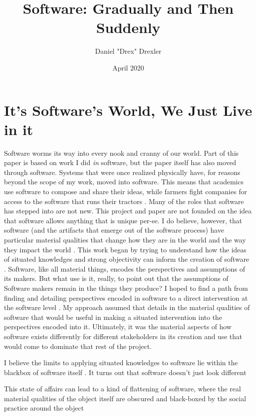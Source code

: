 \documentclass[a4paper,man,natbib]{apa6}
\title{Software: Gradually and Then Suddenly}
\author{Daniel "Drex" Drexler}
\affiliation{Center for Science, Technology and Society at Drexel University}
\date{April 2020}
\begin{document}
   \maketitle
   \section*{It's Software's World, We Just Live in it}
   Software worms its way into every nook and cranny of our world. Part of this paper is based on work I did \textit{in} software, but the paper itself has also moved through software. Systems that were once realized physically have, for reasons beyond the scope of my work, moved into software. This means that academics use software to compose and share their ideas, while farmers fight companies for access to the software that runs their tractors \citep{Koebler2017-dt}. Many of the roles that software has stepped into are not new. This project and paper are not founded on the idea that software allows anything that is unique per-se. I do believe, however, that software (and the artifacts that emerge out of the software process) have particular material qualities that change how they are in the world and the way they impact the world \citep{Mackenzie2006-hb, Kitchin2011-af}. This work began by trying to understand how the ideas of situated knowledges and strong objectivity can inform the creation of software \citep{Harding1992-od,Haraway1988-nh}. Software, like all material things, encodes the perspectives and assumptions of its makers. But what use is it, really, to point out that the assumptions of Software makers remain in the things they produce? I hoped to find a path from finding and detailing perspectives encoded in software to a direct intervention at the software level \citep{Zuiderent-Jerak2015-go}. My approach assumed that details in the material qualities of software that would be useful in making a situated intervention into the perspectives encoded into it. Ultimately, it was the material aspects of how software exists differently for different stakeholders in its creation and use that would come to dominate that rest of the project.

   I believe the limits to applying situated knowledges to software lie within the blackbox of software itself \citep{Latour1999-ui}. It turns out that software doesn't just look different

   This state of affairs can lead to a kind of flattening of software, where the real material qualities of the object itself are obscured and black-boxed by the social practice around the object \citep{Latour1999-ui}
   
  
   \printnoidxglossaries
   \setlength{\parindent}{4em}
   
\end{document}

